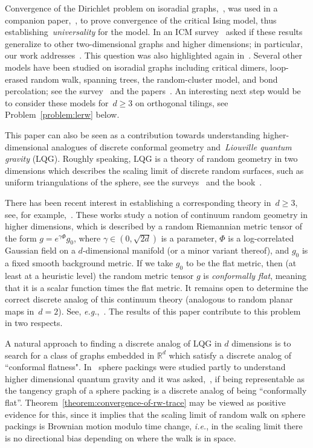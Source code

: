 \documentclass[12pt]{amsart}
\numberwithin{equation}{section}
\newcommand{\eg}{{\it e.g.}}
\newcommand{\ie}{{\it i.e.}}
\begin{document}
Convergence of the Dirichlet problem on isoradial graphs,~\cite{chelkaksmirnov}, was used in a companion paper,~\cite{MR2957303}, to prove
convergence of the critical Ising model, thus establishing~\emph{universality} for the model. 
In an ICM survey~\cite{smirnovicm} asked if these results generalize to other two-dimensional graphs and higher dimensions; in particular, our work addresses~\cite[Questions 1 and 12]{smirnovicm}. This question was also highlighted again in~\cite[Problem 5.9]{skopenkov2013boundary}. 
Several other models have been studied on isoradial graphs including critical dimers, loop-erased random walk, spanning trees, the random-cluster model, and bond percolation; see the survey~\cite{MR3372861} and the papers~\cite{MR3252428, MR3201923,MR3621833, MR3858924}. An interesting next step would be to consider these models for~$d \geq 3$
on orthogonal tilings, see Problem~\ref{problem:lerw} below.

This paper can also be seen as a contribution towards understanding higher-dimensional analogues of discrete conformal geometry and~\emph{Liouville quantum gravity} (LQG). Roughly speaking, LQG is a theory of random geometry in two dimensions which describes the scaling limit of discrete random surfaces, such as uniform triangulations of the sphere, see the surveys~\cite{GwynneSurvey, MR4680280} and the book~\cite{berestycki2024gaussian}. 

There has been recent interest in establishing a corresponding theory in~$d \geq 3$, see, for example,~\cite{schiavo2021conformally, cercle2022, ding2023tightness}. These works study a notion of continuum random geometry in higher dimensions, which is described by a random Riemannian metric tensor of the form $g = e^{\gamma \Phi} g_0$, where $\gamma \in (0,\sqrt{2d})$ is a parameter, $\Phi$ is a log-correlated Gaussian field on a $d$-dimensional manifold (or a minor variant thereof), and $g_0$ is a fixed smooth background metric. If we take $g_0$ to be the flat metric, then (at least at a heuristic level) the random metric tensor $g$ is \emph{conformally flat}, meaning that it is a scalar function times the flat metric. It remains open to determine the correct discrete analog of this continuum theory (analogous to random planar maps in~$d=2$). See, \eg,~\cite[Section 1.2]{ding2023tightness}. The results of this paper contribute to this problem in two respects.


A natural approach to finding a discrete analog of LQG in $d$ dimensions is to search for a class of graphs embedded in $\mathbb R^d$ which satisfy a discrete analog of ``conformal flatness". In~\cite{curienbenjamini} sphere packings were studied partly to understand higher dimensional quantum gravity and it was asked,~\cite[Question 2]{curienbenjamini}, if being representable as the tangency graph of a sphere packing is a discrete analog of being ``conformally flat''. Theorem~\ref{theorem:convergence-of-rw-trace} may be viewed as positive evidence for this, since it implies that the scaling limit of random walk on sphere packings is Brownian motion modulo time change, \ie, in the scaling limit there is no directional bias depending on where the walk is in space.
\end{document}
